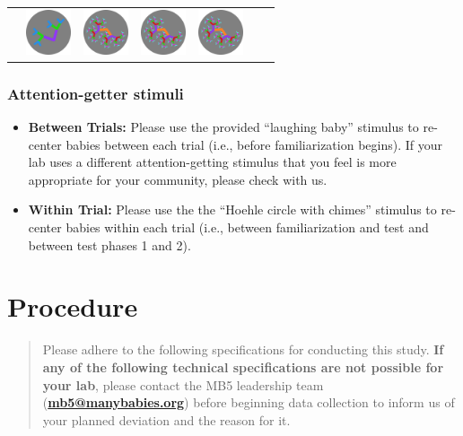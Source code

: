 \documentclass[
  letterpaper,
  DIV=11,
  numbers=noendperiod,
  oneside]{scrreprt}
\providecommand{\tightlist}{%
  \setlength{\itemsep}{0pt}\setlength{\parskip}{0pt}}
\begin{document}
\begin{longtable}[]{@{}lllllll@{}}
&
\includegraphics[width=\linewidth,height=0.52083in,keepaspectratio]{images/fractal-low.png}
&
\includegraphics[width=\linewidth,height=0.52083in,keepaspectratio]{images/fractal-high.png}
&
\includegraphics[width=\linewidth,height=0.52083in,keepaspectratio]{images/fractal-high.png}
&
\includegraphics[width=\linewidth,height=0.52083in,keepaspectratio]{images/fractal-high.png} \\
\end{longtable}

\subsection{Attention-getter stimuli}\label{attention-getter-stimuli}

\begin{itemize}
\tightlist
\item
  \textbf{Between Trials:} Please use the provided ``laughing baby''
  stimulus to re-center babies between each trial (i.e., before
  familiarization begins). If your lab uses a different
  attention-getting stimulus that you feel is more appropriate for your
  community, please check with us.
\item
  \textbf{Within Trial:} Please use the the ``Hoehle circle with
  chimes'' stimulus to re-center babies within each trial (i.e., between
  familiarization and test and between test phases 1 and 2).
\end{itemize}

\chapter{Procedure}\label{sec-procedure}

\begin{quote}
Please adhere to the following specifications for conducting this study.
\textbf{If any of the following technical specifications are not
possible for your lab}, please contact the MB5 leadership team
(\href{mailto:mb5@manybabies.org}{\textbf{mb5@manybabies.org}}) before
beginning data collection to inform us of your planned deviation and the
reason for it.
\end{quote}
\end{document}
